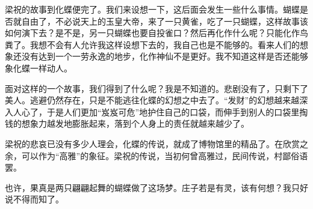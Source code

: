 梁祝的故事到化蝶便完了。我们来设想一下，这后面会发生一些什么事情。蝴蝶是否就自由了，不必说天上的玉皇大帝，来了一只黄雀，吃了一只蝴蝶，这样故事该如何演下去？是不是，另一只蝴蝶也要自投雀口？然后再化作什么呢？只能化作鸟粪了。我想不会有人允许我这样设想下去的，我自己也是不能够的。看来人们的想象还没有达到一个一劳永逸的地步，化作神仙不是更好。我不知道这样是否还能够象化蝶一样动人。

面对这样的一个故事，我们得到了什么呢？我是不知道的。悲剧没有了，只剩下了美人。逃避仍然存在，只是不能逃往化蝶的幻想之中去了。“发财”的幻想越来越深入人心了，于是人们更加“岌岌可危”地护住自己的口袋，而伸手到别人的口袋里掏钱的想象力越发地膨胀起来，落到个人身上的责任就越来越少了。

梁祝的悲哀已没有多少人理会，化蝶的传说，就成了博物馆里的精品了。在欣赏之余，可以作为“高雅”的象征。梁祝的传说，当初何曾高雅过，民间传说，村鄙俗语罢。

也许，果真是两只翩翩起舞的蝴蝶做了这场梦。庄子若是有灵，该有何想？我只好说不得而知了。
